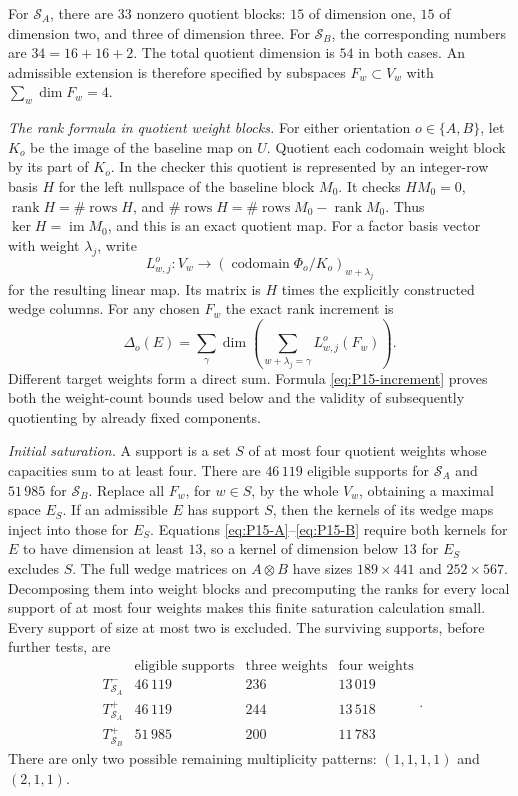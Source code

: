 For $\mathcal S_A$, there are $33$ nonzero quotient blocks: $15$ of
dimension one, $15$ of dimension two, and three of dimension three.
For $\mathcal S_B$, the corresponding numbers are $34=16+16+2$.
The total quotient dimension is $54$ in both cases.
An admissible extension is therefore specified by subspaces
$F_w\subset V_w$ with $\sum_w\dim F_w=4$.

\emph{The rank formula in quotient weight blocks.}
For either orientation $o\in\{A,B\}$, let $K_o$ be the image of the
baseline map on $U$.  Quotient each codomain weight block by its part of
$K_o$.  In the checker this quotient is represented by an integer-row
basis $H$ for the left nullspace of the baseline block $M_0$.  It checks
$HM_0=0$, $\operatorname{rank}H=\#\operatorname{rows}H$, and
$\#\operatorname{rows}H=\#\operatorname{rows}M_0-\operatorname{rank}M_0$.
Thus $\ker H=\operatorname{im}M_0$, and this is an exact quotient map.
For a factor basis vector with weight $\lambda_j$, write
\[
 L^o_{w,j}:V_w\longrightarrow
       (\operatorname{codomain}\Phi_o/K_o)_{w+\lambda_j}
\]
for the resulting linear map.  Its matrix is $H$ times the explicitly
constructed wedge columns.  For any chosen $F_w$ the exact rank increment
is
\begin{equation}
 \Delta_o(E)=
 \sum_{\gamma}\dim\left(
       \sum_{w+\lambda_j=\gamma}L^o_{w,j}(F_w)\right).
 \label{eq:P15-increment}
\end{equation}
Different target weights form a direct sum.  Formula
\eqref{eq:P15-increment} proves both the weight-count bounds used below
and the validity of subsequently quotienting by already fixed components.

\emph{Initial saturation.}
A support is a set $S$ of at most four quotient weights whose capacities
sum to at least four.  There are $46\,119$ eligible supports for
$\mathcal S_A$ and $51\,985$ for $\mathcal S_B$.
Replace all $F_w$, for $w\in S$, by the whole $V_w$, obtaining a maximal
space $E_S$.  If an admissible $E$ has support $S$, then the kernels of
its wedge maps inject into those for $E_S$.  Equations
\eqref{eq:P15-A}--\eqref{eq:P15-B} require both kernels for $E$ to have
dimension at least $13$, so a kernel of dimension below $13$ for $E_S$
excludes $S$.
The full wedge matrices on $A\otimes B$ have sizes $189\times441$ and
$252\times567$.  Decomposing them into weight blocks and precomputing
the ranks for every local support of at most four weights makes this
finite saturation calculation small.  Every support of size at most two
is excluded.  The surviving supports, before further tests, are
\[
\begin{array}{c|r|r|r}
 &\text{eligible supports}&\text{three weights}&\text{four weights}\\\hline
 T^{-}_{\mathcal S_A}&46\,119&236&13\,019\\
 T^{+}_{\mathcal S_A}&46\,119&244&13\,518\\
 T^{+}_{\mathcal S_B}&51\,985&200&11\,783
\end{array}.
\]
There are only two possible remaining multiplicity patterns:
$(1,1,1,1)$ and $(2,1,1)$.

